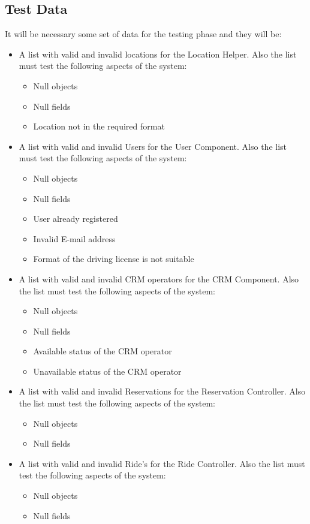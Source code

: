 \documentclass[a4paper]{article}
\begin{document}
\subsection{Test Data}
It will be necessary some set of data for the testing phase and they will be:
\begin{itemize}
\item A list with valid and invalid  locations for the Location Helper. Also the list must test the following aspects of the system:
\begin{itemize}
     \item Null objects
     \item Null fields
     \item Location not in the required format
   \end{itemize}
\item A list with valid and invalid Users for the User Component. Also the list must test the following aspects of the system:
\begin{itemize}
     \item Null objects
     \item Null fields
     \item User already registered
     \item Invalid E-mail address
     \item Format of the driving license is not suitable   \end{itemize}
\item A list with valid and invalid CRM operators for the CRM Component. Also the list must test the following aspects of the system:
\begin{itemize}
     \item Null objects
     \item Null fields
     \item Available status of the CRM operator
     \item Unavailable status of the CRM operator   
     \end{itemize}
     
\item A list with valid and invalid Reservations for the Reservation Controller. Also the list must test the following aspects of the system:
\begin{itemize}
     \item Null objects
     \item Null fields
     \end{itemize}

\item A list with valid and invalid Ride's for the Ride Controller. Also the list must test the following aspects of the system:
\begin{itemize}
     \item Null objects
     \item Null fields
     \end{itemize}
     

\end{itemize}
\end{document}

